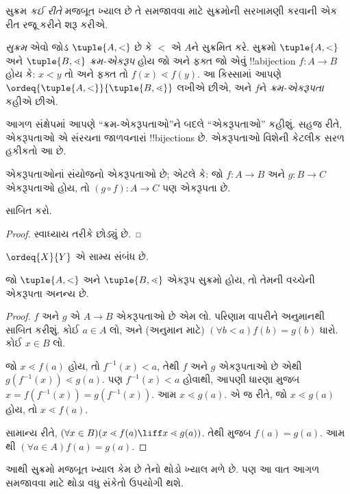 \documentclass[../../../include/open-logic-section]{subfiles}
\begin{document}

સુક્રમ \emph{કઈ રીતે} મજબૂત ખ્યાલ છે તે સમજાવવા માટે
સુક્રમોની સરખામણી કરવાની એક રીત રજૂ કરીને શરૂ કરીએ.

\begin{defn}
\emph{સુક્રમ} એવો જોડ $\tuple{A, <}$ છે કે $<$ એ $A$ને
સુક્રમિત કરે. સુક્રમો $\tuple{A, <}$ અને $\tuple{B,
\lessdot}$ \emph{ક્રમ-એકરૂપ} હોય જો અને ફક્ત જો એવું
!!a{bijection} $f \colon A \to B$ હોય કે:
$x < y$ તો અને ફક્ત તો $f(x) \lessdot  f(y)$.
આ કિસ્સામાં આપણે
$\ordeq{\tuple{A, <}}{\tuple{B, \lessdot}}$ લખીએ છીએ,
અને $f$ને \emph{ક્રમ-એકરૂપતા} કહીએ છીએ.
\end{defn}
\noindent
આગળ સંક્ષેપમાં આપણે “ક્રમ-એકરૂપતાઓ”ને બદલે “એકરૂપતાઓ”
કહીશું. સહજ રીતે, એકરૂપતાઓ એ સંરચના જાળવનારાં
!!{bijection}s છે. એકરૂપતાઓ વિશેની કેટલીક સરળ હકીકતો આ છે.

\begin{lem}
એકરૂપતાઓનાં સંયોજનો એકરૂપતાઓ છે; એટલે કે:
જો $f \colon A
\to B$ અને $g \colon B \to C$ એકરૂપતાઓ હોય,
તો $(g \circ f)
\colon A \to C$ પણ એકરૂપતા છે.
\end{lem}
\begin{prob}
	 સાબિત કરો.
\end{prob}
\begin{proof}
સ્વાધ્યાય તરીકે છોડ્યું છે.
\end{proof}
\begin{cor}
	$\ordeq{X}{Y}$ એ સામ્ય સંબંધ છે.
\end{cor}
\begin{prop}
જો $\tuple{A, <}$ અને $\tuple{B, \lessdot}$ એકરૂપ સુક્રમો હોય,
તો તેમની વચ્ચેની એકરૂપતા અનન્ય છે.
\end{prop}

\begin{proof}
$f$ અને $g$ એ $A \to B$ એકરૂપતાઓ છે એમ લો.
પરિણામ  વાપરીને અનુમાનથી
સાબિત કરીશું.
કોઈ $a\in A$ લો, અને (અનુમાન માટે)
$(\forall b < a)f(b) = g(b)$ ધારો. કોઈ $x \in B$ લો.

જો $x \lessdot f(a)$ હોય, તો $f^{-1}(x) < a$,
તેથી $f$ અને $g$ એકરૂપતાઓ છે એથી
$g(f^{-1}(x)) \lessdot
g(a)$. પણ $f^{-1}(x) < a$ હોવાથી, આપણી ધારણા મુજબ
$x =f(f^{-1}(x)) = g(f^{-1}(x))$.
આમ $x \lessdot g(a)$. એ જ રીતે, જો
$x \lessdot g(a)$ હોય, તો $x \lessdot f(a)$.

સામાન્ય રીતે,
$(\forall x \in B)(x \lessdot f(a) \liff x \lessdot
g(a))$. તેથી
મુજબ $f(a) = g(a)$. આમ
થી
$(\forall
a \in A)f(a) = g(a)$.
\end{proof}\noindent
આથી સુક્રમો મજબૂત ખ્યાલ કેમ છે તેનો થોડો ખ્યાલ મળે છે.
પણ આ વાત આગળ સમજાવવા માટે થોડા વધુ સંકેતો ઉપયોગી થશે.
\end{document}
